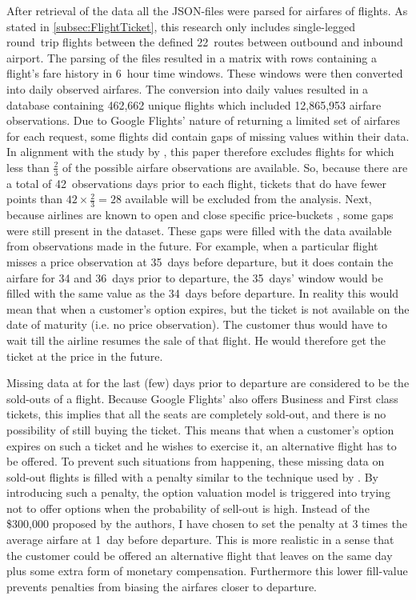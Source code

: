 After retrieval of the data all the JSON-files were parsed for airfares of flights. As stated in \autoref{subsec:FlightTicket}, this research only includes single-legged round~trip flights between the defined 22~routes between outbound and inbound airport. The parsing of the files resulted in a matrix with rows containing a flight's fare history in 6~hour time windows. These windows were then converted into daily observed airfares. The conversion into daily values resulted in a database containing 462,662 unique flights which included 12,865,953 airfare observations. Due to Google Flights' nature of returning a limited set of airfares for each request, some flights did contain gaps of missing values within their data. In alignment with the study by , this paper therefore excludes flights for which less than $\frac{2}{3}$ of the possible airfare observations are available. So, because there are a total of 42~observations days prior to each flight, tickets that do have fewer points than $42 \times \frac{2}{3} = 28$ available will be excluded from the analysis. Next, because airlines are known to open and close specific price-buckets \cite{mcgill1999revenue}, some gaps were still present in the dataset. These gaps were filled with the data available from observations made in the future. For example, when a particular flight misses a price observation at 35~days before departure, but it does contain the airfare for 34 and 36~days prior to departure, the 35~days' window would be filled with the same value as the 34~days before departure. In reality this would mean that when a customer's option expires, but the ticket is not available on the date of maturity (i.e. no price observation). The customer thus would have to wait till the airline resumes the sale of that flight. He would therefore get the ticket at the price in the future.

Missing data at for the last (few) days prior to departure are considered to be the sold-outs of a flight. Because Google Flights' also offers Business and First class tickets, this implies that all the seats are completely sold-out, and there is no possibility of still buying the ticket. This means that when a customer's option expires on such a ticket and he wishes to exercise it, an alternative flight has to be offered. To prevent such situations from happening, these missing data on sold-out flights is filled with a penalty similar to the technique used by . By introducing such a penalty, the option valuation model is triggered into trying not to offer options when the probability of sell-out is high. Instead of the \$300,000 proposed by the authors, I have chosen to set the penalty at 3 times the average airfare at 1~day before departure. This is more realistic in a sense that the customer could be offered an alternative flight that leaves on the same day plus some extra form of monetary compensation. Furthermore this lower fill-value prevents penalties from biasing the airfares closer to departure.

